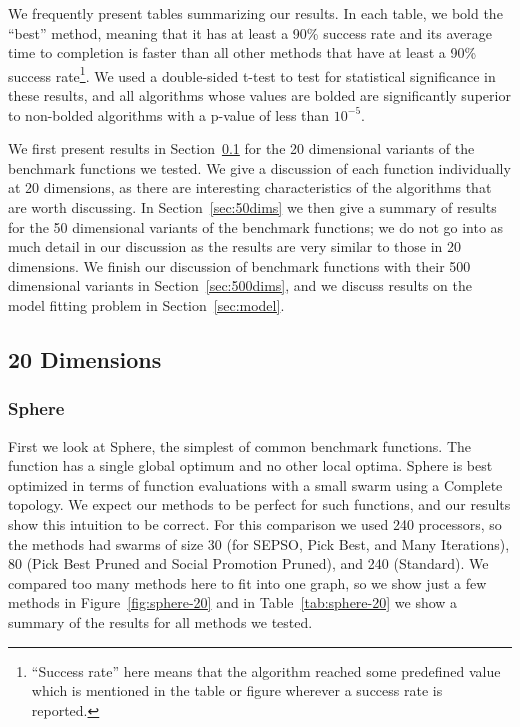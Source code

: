\documentclass[smallcondensed]{svjour3}
\renewcommand{\sec}[1]{Section~\ref{sec:#1}}
\newcommand{\fig}[1]{Figure~\ref{fig:#1}}
\newcommand{\tabref}[1]{Table~\ref{tab:#1}}
\begin{document}
We frequently present tables summarizing our results.  In each table, we bold
the ``best'' method, meaning that it has at least a 90\% success rate and its
average time to completion is faster than all other methods that have at least
a 90\% success rate\footnote{``Success rate'' here means that the algorithm
reached some predefined value which is mentioned in the table or figure
wherever a success rate is reported.}.  We used a double-sided t-test to test
for statistical significance in these results, and all algorithms whose values
are bolded are significantly superior to non-bolded algorithms with a p-value
of less than $10^{-5}$.

We first present results in \sec{20dims} for the 20 dimensional variants of the
benchmark functions we tested.  We give a discussion of each function
individually at 20 dimensions, as there are interesting characteristics of the
algorithms that are worth discussing.  In \sec{50dims} we then give a summary
of results for the 50 dimensional variants of the benchmark functions; we do
not go into as much detail in our discussion as the results are very similar to
those in 20 dimensions.  We finish our discussion of benchmark functions with
their 500 dimensional variants in \sec{500dims}, and we discuss results on the
model fitting problem in \sec{model}.

\subsection{20 Dimensions}
\label{sec:20dims}

\subsubsection{Sphere}
\label{sec:sphere20dims}

First we look at Sphere, the simplest of common benchmark functions.  The
function has a single global optimum and no other local optima.  Sphere is best
optimized in terms of function evaluations with a small swarm using a Complete
topology.  We expect our methods to be perfect for such functions, and our
results show this intuition to be correct.  For this comparison we used 240
processors, so the methods had swarms of size 30 (for SEPSO, Pick Best, and
Many Iterations), 80 (Pick Best Pruned and Social Promotion Pruned), and 240
(Standard).  We compared too many methods here to fit into one graph, so we
show just a few methods in \fig{sphere-20} and in \tabref{sphere-20} we show a
summary of the results for all methods we tested.
\end{document}
